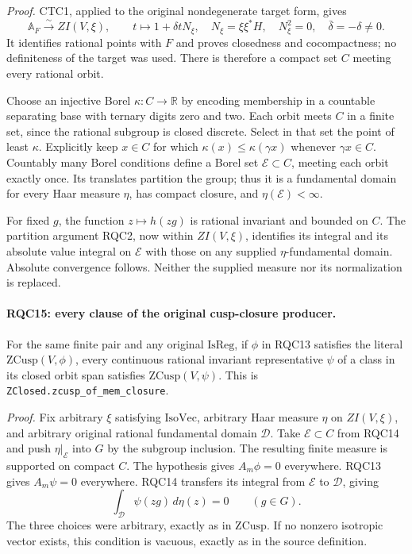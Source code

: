\documentclass[11pt,a4paper]{article}
\numberwithin{equation}{section}
\theoremstyle{remark}\newtheorem{remark}[theorem]{Remark}
\begin{document}
\emph{Proof.}
CTC1, applied to the original nondegenerate target form, gives
\[
 \mathbb A_F\xrightarrow{\ \sim\ }ZI(V,\xi),\qquad
 t\longmapsto1+\delta tN_\xi,\quad
 N_\xi=\xi\xi^*H,\quad N_\xi^2=0,\quad
 \bar\delta=-\delta\ne0.
 \tag{RQC.20}
\]
It identifies rational points with \(F\) and proves closedness and
cocompactness; no definiteness of the target was used.  There is
therefore a compact set \(C\) meeting every rational orbit.

Choose an injective Borel \(\kappa:C\to\mathbb R\) by encoding
membership in a countable separating base with ternary digits
zero and two.  Each orbit meets \(C\) in a finite set, since the
rational subgroup is closed discrete.  Select in that set the
point of least \(\kappa\).  Explicitly keep \(x\in C\) for which
\(\kappa(x)\le\kappa(\gamma x)\) whenever \(\gamma x\in C\).
Countably many Borel conditions define a Borel set
\(\mathcal E\subset C\), meeting each orbit exactly once.
Its translates partition the group; thus it is a fundamental
domain for every Haar measure \(\eta\), has compact closure,
and \(\eta(\mathcal E)<\infty\).

For fixed \(g\), the function \(z\mapsto h(zg)\) is rational
invariant and bounded on \(C\).  The partition argument RQC2,
now within \(ZI(V,\xi)\), identifies its integral and its absolute
value integral on \(\mathcal E\) with those on any supplied
\(\eta\)-fundamental domain.  Absolute convergence follows.
Neither the supplied measure nor its normalization is replaced.

\paragraph{RQC15: every clause of the original cusp-closure producer.}
\label{claim:RQC15}
For the same finite pair and any original \(\mathrm{IsReg}\), if \(\phi\)
in RQC13 satisfies the literal \(\mathrm{ZCusp}(V,\phi)\), every
continuous rational invariant representative \(\psi\) of a class
in its closed orbit span satisfies \(\mathrm{ZCusp}(V,\psi)\).
This is \texttt{ZClosed.zcusp\_of\_mem\_closure}.

\emph{Proof.}
Fix arbitrary \(\xi\) satisfying \(\mathrm{IsoVec}\), arbitrary
Haar measure \(\eta\) on \(ZI(V,\xi)\), and arbitrary original
rational fundamental domain \(\mathcal D\).
Take \(\mathcal E\subset C\) from RQC14 and push
\(\eta|_{\mathcal E}\) into \(G\) by the subgroup inclusion.
The resulting finite measure is supported on compact \(C\).
The hypothesis gives \(A_m\phi=0\) everywhere.  RQC13 gives
\(A_m\psi=0\) everywhere.  RQC14 transfers its integral from
\(\mathcal E\) to \(\mathcal D\), giving
\[
 \int_{\mathcal D}\psi(zg)\,d\eta(z)=0\qquad(g\in G).
 \tag{RQC.21}
\]
The three choices were arbitrary, exactly as in \(\mathrm{ZCusp}\).
If no nonzero isotropic vector exists, this condition is vacuous,
exactly as in the source definition.
\end{document}
